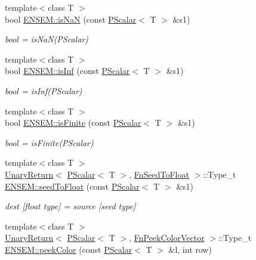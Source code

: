\begin{DoxyCompactItemize}
{\footnotesize template$<$class T $>$ }\\bool \mbox{\hyperlink{group__primscalar_ga45c19c10ac52adfa3deff1ead05f3dbc}{E\+N\+S\+E\+M\+::is\+NaN}} (const \mbox{\hyperlink{classENSEM_1_1PScalar}{P\+Scalar}}$<$ T $>$ \&s1)
\begin{DoxyCompactList}\small\item\em bool = is\+Na\+N(\+P\+Scalar) \end{DoxyCompactList}\item 
{\footnotesize template$<$class T $>$ }\\bool \mbox{\hyperlink{group__primscalar_gadaa3bcd952c27bc79132fc1037584dcc}{E\+N\+S\+E\+M\+::is\+Inf}} (const \mbox{\hyperlink{classENSEM_1_1PScalar}{P\+Scalar}}$<$ T $>$ \&s1)
\begin{DoxyCompactList}\small\item\em bool = is\+Inf(\+P\+Scalar) \end{DoxyCompactList}\item 
{\footnotesize template$<$class T $>$ }\\bool \mbox{\hyperlink{group__primscalar_ga3dab2cae6c55a7a86676323b203a758d}{E\+N\+S\+E\+M\+::is\+Finite}} (const \mbox{\hyperlink{classENSEM_1_1PScalar}{P\+Scalar}}$<$ T $>$ \&s1)
\begin{DoxyCompactList}\small\item\em bool = is\+Finite(\+P\+Scalar) \end{DoxyCompactList}\item 
{\footnotesize template$<$class T $>$ }\\\mbox{\hyperlink{structENSEM_1_1UnaryReturn}{Unary\+Return}}$<$ \mbox{\hyperlink{classENSEM_1_1PScalar}{P\+Scalar}}$<$ T $>$, \mbox{\hyperlink{structENSEM_1_1FnSeedToFloat}{Fn\+Seed\+To\+Float}} $>$\+::Type\+\_\+t \mbox{\hyperlink{group__primscalar_ga5a261606d393edcbce00c050e5a5cbd5}{E\+N\+S\+E\+M\+::seed\+To\+Float}} (const \mbox{\hyperlink{classENSEM_1_1PScalar}{P\+Scalar}}$<$ T $>$ \&s1)
\begin{DoxyCompactList}\small\item\em dest \mbox{[}float type\mbox{]} = source \mbox{[}seed type\mbox{]} \end{DoxyCompactList}\item 
{\footnotesize template$<$class T $>$ }\\\mbox{\hyperlink{structENSEM_1_1UnaryReturn}{Unary\+Return}}$<$ \mbox{\hyperlink{classENSEM_1_1PScalar}{P\+Scalar}}$<$ T $>$, \mbox{\hyperlink{structENSEM_1_1FnPeekColorVector}{Fn\+Peek\+Color\+Vector}} $>$\+::Type\+\_\+t \mbox{\hyperlink{group__primscalar_ga99ea9420e1cb79a4dbc92fd7aab84f80}{E\+N\+S\+E\+M\+::peek\+Color}} (const \mbox{\hyperlink{classENSEM_1_1PScalar}{P\+Scalar}}$<$ T $>$ \&l, int row)

\end{DoxyCompactItemize}
